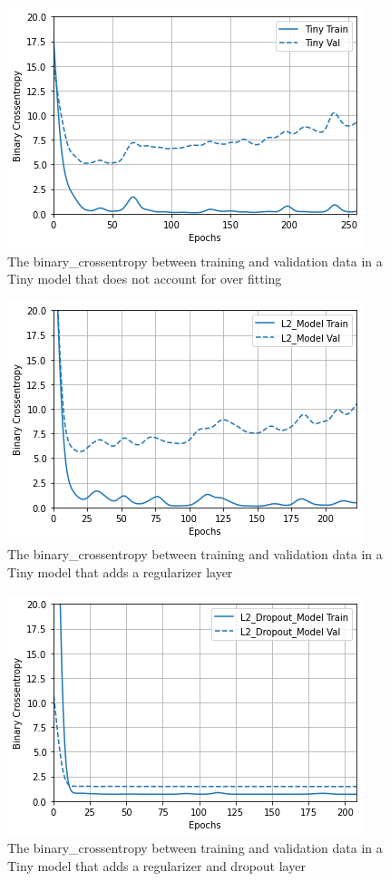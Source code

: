\documentclass[12pt]{IEEEtran}
\begin{document}
\begin{figure}[!]
	\centering
	\includegraphics[width=0.7\linewidth]{Images/tinyModel}
	\caption{The binary\_crossentropy between training and validation data in a Tiny model that does not account for over fitting}
	\label{fig:tinymodel}
\end{figure}

\begin{figure}[!]
	\centering
	\includegraphics[width=0.7\linewidth]{Images/regularizerModel}
	\caption{The binary\_crossentropy between training and validation data in a Tiny model that adds a regularizer layer}
	\label{fig:regularizermodel}
\end{figure}

\begin{figure}[!]
	\centering
	\includegraphics[width=0.7\linewidth]{Images/regularizerDropoutModel}
	\caption{The binary\_crossentropy between training and validation data in a Tiny model that adds a regularizer and dropout layer}
	\label{fig:regularizerdropoutmodel}
\end{figure}
\end{document}

